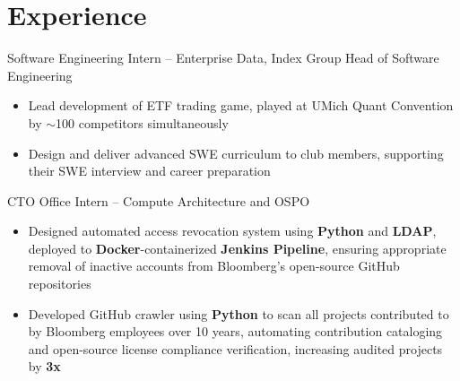 \documentclass[letterpaper,11pt]{article}
\begin{document}
\section{Experience}
{Software Engineering Intern -- Enterprise Data, Index Group}{}
{Head of Software Engineering}{}
\begin{itemize}
    \item Lead development of ETF trading game, played at UMich Quant Convention
          by $\sim$100 competitors simultaneously
    \item Design and deliver advanced SWE curriculum to club members, supporting
          their SWE interview and career preparation
\end{itemize}
{CTO Office Intern -- Compute Architecture and OSPO}{}
\begin{itemize}
    \item Designed automated access revocation system using \textbf{Python} and
          \textbf{LDAP}, deployed to \textbf{Docker}-containerized
          \textbf{Jenkins Pipeline}, ensuring appropriate removal of inactive
          accounts from Bloomberg's open-source GitHub repositories
    \item Developed GitHub crawler using \textbf{Python} to scan all projects
          contributed to by Bloomberg employees over 10 years, automating
          contribution cataloging and open-source license compliance
          verification, increasing audited projects by \textbf{3x}
\end{itemize}
\end{document}
